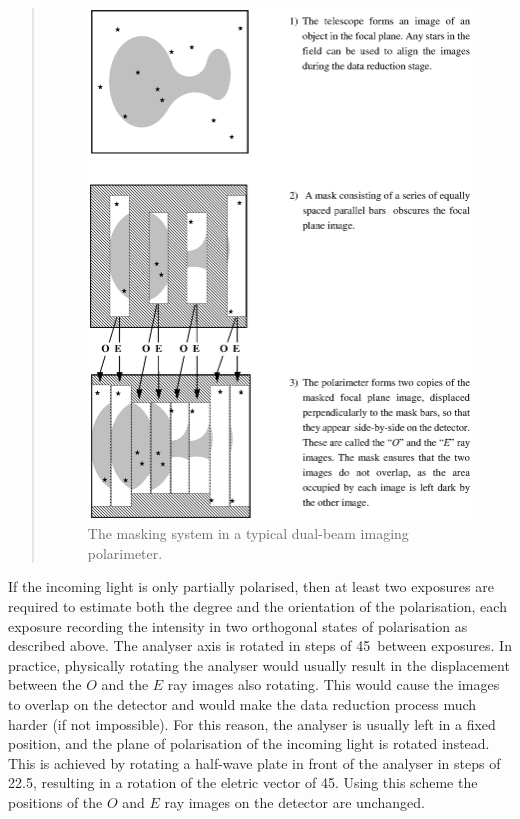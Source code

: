 \begin{htmlonly}
   \begin{quote}
   \begin{figure}[btp]
   \label{fig:grids}
   \includegraphics[scale=1.2]{sun223_figures/grids.eps}
   \caption{The masking system in a typical dual-beam imaging polarimeter.}
   \end{figure}
   \end{quote}
\end{htmlonly}


If the incoming light is only partially polarised, then at least two
exposures are required to estimate both the degree and the orientation of
the polarisation, each exposure recording the intensity in two orthogonal
states of polarisation as described above. The analyser axis is rotated
in steps of 45\dgs\ between exposures. In practice, physically
rotating the analyser would usually result in the displacement between
the $O$ and the $E$ ray images also rotating. This would cause the images
to overlap on the detector and would make the data reduction process much
harder (if not impossible). For this reason, the analyser is usually left
in a fixed position, and the plane of polarisation of the incoming light
is rotated instead. This is achieved by rotating a half-wave plate in
front of the analyser in steps of 22.5\dgs, resulting in a rotation
of the eletric vector of 45\dgs. Using this scheme the positions of
the $O$ and $E$ ray images on the detector are unchanged.

